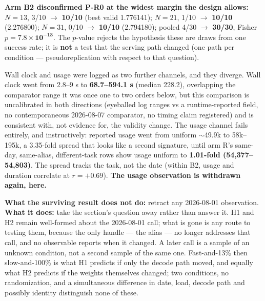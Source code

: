 \textbf{Arm B2 disconfirmed P-R0 at the widest margin the design allows:} $N = 13$, 3/10 $\to$ \textbf{10/10} (best valid 1.776141); $N = 21$, 1/10 $\to$ \textbf{10/10} (2.276800); $N = 31$, 0/10 $\to$ \textbf{10/10} (2.794180); pooled 4/30 $\to$ \textbf{30/30}, Fisher $p = \mathbf{7.8\times10^{-13}}$. The $p$-value rejects the hypothesis these are draws from one success rate; it is \textbf{not} a test that the serving path changed (one path per condition --- pseudoreplication with respect to that question).

Wall clock and usage were logged as two further channels, and they diverge. Wall clock went from 2.8--9 s to \textbf{68.7--594.1 s} (median 228.2), overlapping the comparator range it was once one to two orders below, but this comparison is uncalibrated in both directions (eyeballed log ranges vs a runtime-reported field, no contemporaneous 2026-08-07 comparator, no timing claim registered) and is consistent with, not evidence for, the validity change. The usage channel fails entirely, and instructively: reported usage went from uniform $\sim$49.9k to 58k--195k, a 3.35-fold spread that looks like a second signature, until arm R's same-day, same-alias, different-task rows show usage uniform to \textbf{1.01-fold (54{,}377--54{,}803)}. The spread tracks the task, not the date (within B2, usage and duration correlate at $r = +0.69$). \textbf{The usage observation is withdrawn again, here.}

\textbf{What the surviving result does not do:} retract any 2026-08-01 observation. \textbf{What it does:} take the section's question away rather than answer it. H1 and H2 remain well-formed about the 2026-08-01 call; what is gone is any route to testing them, because the only handle --- the alias --- no longer addresses that call, and no observable reports when it changed. A later call is a sample of an unknown condition, not a second sample of the same one. Fast-and-13\% then slow-and-100\% is what H1 predicts if only the decode path moved, and equally what H2 predicts if the weights themselves changed; two conditions, no randomization, and a simultaneous difference in date, load, decode path and possibly identity distinguish none of these.

